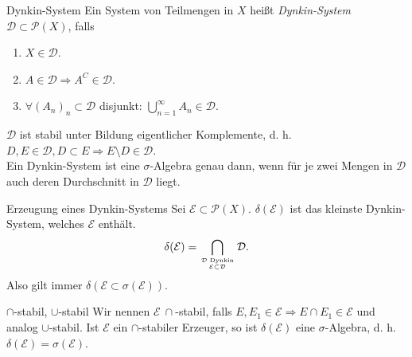 \begin{karte}{Dynkin-System}
	Ein System von Teilmengen in \(X\) heißt 
	\textit{Dynkin-System} \(\mathcal{D} \subset \mathcal{P}(X)\), falls 
	\begin{enumerate}
		\item \(X \in \mathcal{D}\).
		\item \( A \in \mathcal{D} \Rightarrow A^C \in \mathcal{D} \).
		\item \( \forall (A_n)_n \subset \mathcal{D} \) disjunkt: \( \bigcup_{n=1}^\infty A_n \in \mathcal{D} \).
	\end{enumerate}
	\( \mathcal{D} \) ist stabil unter Bildung eigentlicher Komplemente, d. h. \( D,E \in \mathcal{D}, D \subset E \Rightarrow E \setminus D \in \mathcal{D} \).\\
	Ein Dynkin-System ist eine \(\sigma\)-Algebra genau 
	dann, wenn für je zwei Mengen in \(\mathcal{D}\) auch 
	deren Durchschnitt in \( \mathcal{D} \) liegt.
\end{karte}
\begin{karte}{Erzeugung eines Dynkin-Systems}
	Sei \( \mathcal{E} \subset \mathcal{P}(X) \). \(\delta(\mathcal{E})\) ist das kleinste Dynkin-System, 
	welches \( \mathcal{E} \) enthält. 
	\[ \delta(\mathcal{E}) = \bigcap_{\mathcal{D} \text{ Dynkin} \atop \mathcal{E} \subset \mathcal{D} } \mathcal{D}.  \]
	Also gilt immer \( \delta(\mathcal{E} \subset \sigma(\mathcal{E})) \). 
\end{karte}
\begin{karte}{\( \cap\)-stabil, \(\cup\)-stabil}
	Wir nennen \( \mathcal{E}\ \cap \)-stabil, falls 
	\( E, E_1 \in \mathcal{E} \Rightarrow E \cap E_1 \in \mathcal{E} \) und analog \(\cup\)-stabil.
	Ist \( \mathcal{E} \) ein \(\cap\)-stabiler Erzeuger, so ist \(\delta(\mathcal{E})\) eine \( \sigma \)-Algebra, 
	d. h. \( \delta(\mathcal{E}) = \sigma(\mathcal{E}) \).
\end{karte}